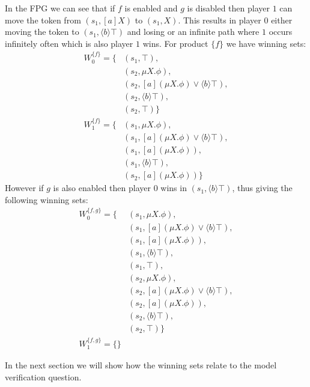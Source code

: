 In the FPG we can see that if $f$ is enabled and $g$ is disabled then player $1$ can move the token from $(s_1, [a]X)$ to $(s_1,X)$. This results in player $0$ either moving the token to $(s_1, \langle b \rangle \top)$ and losing or an infinite path where $1$ occurs infinitely often which is also player $1$ wins. For product $\{f\}$ we have winning sets:
\begin{align*}
W_0^{\{f\}} = \{
& (s_1, \top),\\
& (s_2, \mu X.\phi),\\
& (s_2, [a](\mu X.\phi) \vee \langle b \rangle \top),\\
& (s_2, \langle b \rangle \top),\\
& (s_2, \top)
\}\\
W_1^{\{f\}} = \{& (s_1, \mu X.\phi),\\
& (s_1, [a](\mu X.\phi) \vee \langle b \rangle \top),\\
& (s_1, [a](\mu X.\phi)),\\
& (s_1, \langle b \rangle \top ),\\
& (s_2, [a](\mu X.\phi))\}
\end{align*}
However if $g$ is also enabled then player $0$ wins in $(s_1, \langle b \rangle \top)$, thus giving the following winning sets:
\begin{align*}
W_0^{\{f,g\}} = \{& (s_1, \mu X.\phi),\\
& (s_1, [a](\mu X.\phi) \vee \langle b \rangle \top),\\
& (s_1, [a](\mu X.\phi)),\\
& (s_1, \langle b \rangle \top ),\\
& (s_1, \top),\\
& (s_2, \mu X.\phi),\\
& (s_2, [a](\mu X.\phi) \vee \langle b \rangle \top),\\
& (s_2, [a](\mu X.\phi)),\\
& (s_2, \langle b \rangle \top),\\
& (s_2, \top)
\}\\
W_1^{\{f,g\}} = \{\}
\end{align*}

In the next section we will show how the winning sets relate to the model verification question.


